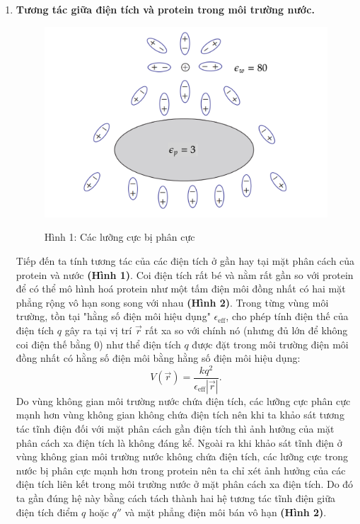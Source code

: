 \begin{enumerate}
    \item \textbf{Tương tác giữa điện tích và protein trong môi trường nước.} \\
    \begin{center}
    \begin{figure}[htp]
    \begin{center}
        \includegraphics[scale=.23
        ]{Problem_13/image/1.png}
    \end{center}
    \begin{center}
    Hình 1: Các lưỡng cực bị phân cực
    \end{center}
    \end{figure}
\end{center}
    Tiếp đến ta tính tương tác của các điện tích ở gần hay tại mặt phân cách của protein và nước \textbf{(Hình 1)}. Coi điện tích rất bé và nằm rất gần so với protein để có thể mô hình hoá protein như một tấm điện môi đồng nhất có hai mặt phẳng rộng vô hạn song song với nhau \textbf{(Hình 2)}. Trong từng vùng môi trường, tồn tại "hằng số điện môi hiệu dụng" $\epsilon_{\text{eff}}$, cho phép tính điện thế của điện tích $q$ gây ra tại vị trí $\Vec{r}$ rất xa so với chính nó (nhưng đủ lớn để không coi điện thế bằng $0$) như thể điện tích $q$ được đặt trong môi trường điện môi đồng nhất có hằng số điện môi bằng hằng số điện môi hiệu dụng:$$V(\Vec{r})=\dfrac{kq^2}{\epsilon_{\text{eff}}\left|\Vec{r}\right|}.$$ Do vùng không gian môi trường nước chứa điện tích, các lưỡng cực phân cực mạnh hơn vùng không gian không chứa điện tích nên khi ta khảo sát tương tác tĩnh điện đối với mặt phân cách gần điện tích thì ảnh hưởng của mặt phân cách xa điện tích là không đáng kể. Ngoài ra khi khảo sát tĩnh điện ở vùng không gian môi trường nước không chứa điện tích, các lưỡng cực trong nước bị phân cực mạnh hơn trong protein nên ta chỉ xét ảnh hưởng của các điện tích liên kết trong môi trường nước ở mặt phân cách xa điện tích. Do đó ta gần đúng hệ này bằng cách tách thành hai hệ tương tác tĩnh điện giữa điện tích điểm $q$ hoặc $q''$ và mặt phẳng điện môi bán vô hạn \textbf{(Hình 2)}.

\end{enumerate}
